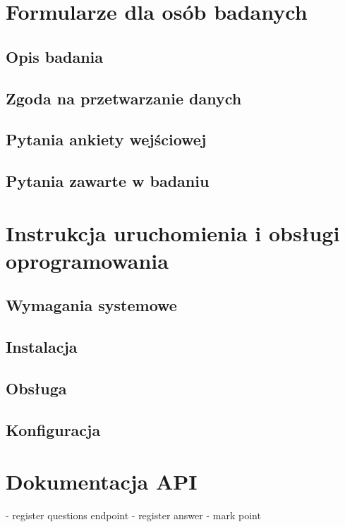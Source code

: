 \documentclass{./assets/wfis}
\begin{document}
\appendix
\chapter{Formularze dla osób badanych}\label{formularz-dla-osoby-badanej}
\section{Opis badania}\label{opis-badania}
\section{Zgoda na przetwarzanie danych}\label{zgoda-na-przetwarzanie-danych}
\section{Pytania ankiety wejściowej}\label{pytania-ankiety-wejsciowej}
\section{Pytania zawarte w badaniu}\label{pytania-badania}
\chapter{Instrukcja uruchomienia i obsługi oprogramowania}\label{instrukcja}
\section{Wymagania systemowe}
\section{Instalacja}
\section{Obsługa}
\section{Konfiguracja}
\chapter{Dokumentacja API}\label{api}
- register questions endpoint
- register answer
- mark point

\printbibliography

\clearpage
\listoffigures
\clearpage
\listoftables
\clearpage
\end{document}
